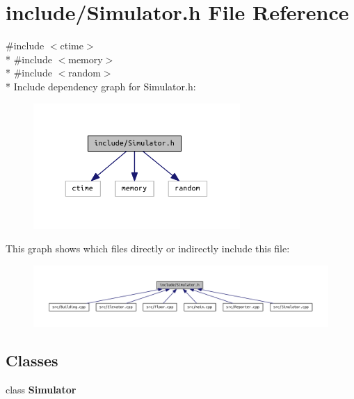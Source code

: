 \section{include/\+Simulator.h File Reference}
\label{_simulator_8h}
{\ttfamily \#include $<$ctime$>$}\\*
{\ttfamily \#include $<$memory$>$}\\*
{\ttfamily \#include $<$random$>$}\\*
Include dependency graph for Simulator.\+h\+:
\nopagebreak
\begin{figure}[H]
\begin{center}
\leavevmode
\includegraphics[width=223pt]{_simulator_8h__incl}
\end{center}
\end{figure}
This graph shows which files directly or indirectly include this file\+:
\nopagebreak
\begin{figure}[H]
\begin{center}
\leavevmode
\includegraphics[width=350pt]{_simulator_8h__dep__incl}
\end{center}
\end{figure}
\subsection*{Classes}
\begin{DoxyCompactItemize}
\item 
class {\bf Simulator}
\end{DoxyCompactItemize}

